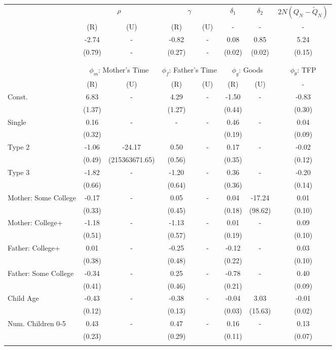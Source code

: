 \begin{tabular}{lccccccc}\toprule
 & \multicolumn{2}{c}{$\rho$} & \multicolumn{2}{c}{$\gamma$} & {$\delta_{1}$} & {$\delta_{2}$} & $2N(Q_{N} - \tilde{Q}_{N})$ \\
 & (R) & (U) & (R) & (U) & - & - & - \\\cmidrule(r){2-3}\cmidrule(r){4-5}\cmidrule(r){6-6}\cmidrule(r){7-7}\cmidrule(r){8-8}
&-2.74& - &-0.82& - &0.08&0.85&5.24\\
&(0.79)& - &(0.27)& - &(0.02)&(0.02)&(0.15)\\
\\
&&&&&&&\\
 & \multicolumn{2}{c}{$\phi_{m}$: Mother's Time} & \multicolumn{2}{c}{$\phi_{f}$: Father's Time} & \multicolumn{2}{c}{$\phi_{g}$: Goods} &{$\phi_{\theta}$: TFP} \\
 & (R) & (U) & (R) & (U) & (R) & (U) & -  \\\cmidrule(r){2-3}\cmidrule(r){4-5}\cmidrule(r){6-7}\cmidrule(r){8-8}
Const.&6.83& -&4.29& -&-1.50& -&-0.83\\
&(1.37)&&(1.27)&&(0.44)&&(0.30)\\
Single&0.16& -& - & -&0.46& -&0.04\\
&(0.32)& & &&(0.19)&&(0.09)\\
Type 2&-1.06&-24.17&0.50& -&0.17& -&-0.02\\
&(0.49)&(215363671.65)&(0.56)&&(0.35)&&(0.12)\\
Type 3&-1.82& -&-1.20& -&0.36& -&-0.20\\
&(0.66)&&(0.64)&&(0.36)&&(0.14)\\
Mother: Some College&-0.17& -&0.05& -&0.04&-17.24&0.01\\
&(0.33)&&(0.45)&&(0.18)&(98.62)&(0.10)\\
Mother: College+&-1.18& -&-1.13& -&0.01& -&0.09\\
&(0.51)&&(0.57)&&(0.19)&&(0.10)\\
Father: College+&0.01& -&-0.25& -&-0.12& -&0.03\\
&(0.38)&&(0.48)&&(0.22)&&(0.10)\\
Father: Some College&-0.34& -&0.25& -&-0.78& -&0.40\\
&(0.41)&&(0.46)&&(0.21)&&(0.09)\\
Child Age&-0.43& -&-0.38& -&-0.04&3.03&-0.01\\
&(0.12)&&(0.13)&&(0.03)&(15.63)&(0.02)\\
Num. Children 0-5&0.43& -&0.47& -&0.16& -&0.13\\
&(0.23)&&(0.29)&&(0.11)&&(0.07)\\
\\
\bottomrule\end{tabular}